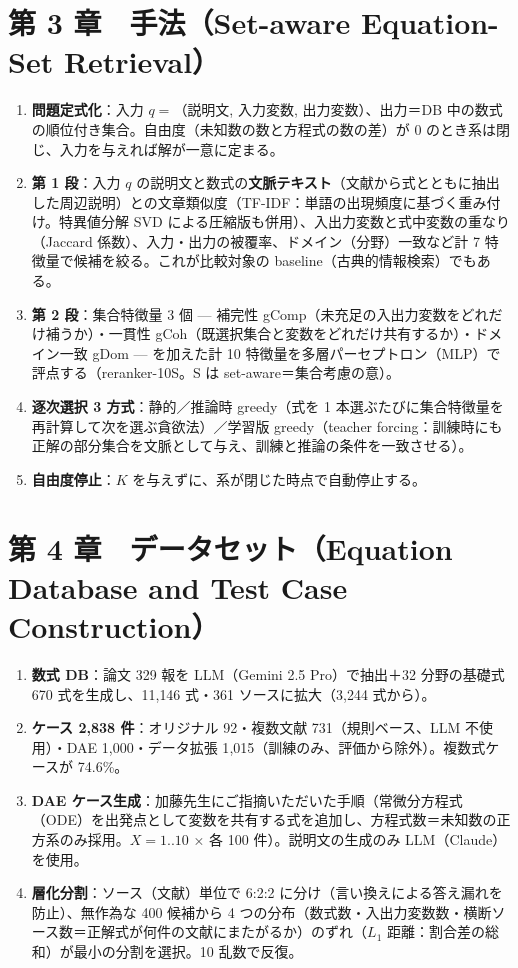 \documentclass[11pt,a4paper]{ltjsarticle}
\begin{document}
\section*{第 3 章　手法（Set-aware Equation-Set Retrieval）}
\begin{enumerate}
  \item \textbf{問題定式化}：入力 $q=$（説明文, 入力変数, 出力変数）、出力＝DB 中の数式の順位付き集合。自由度（未知数の数と方程式の数の差）が 0 のとき系は閉じ、入力を与えれば解が一意に定まる。
  \item \textbf{第 1 段}：入力 $q$ の説明文と数式の\textbf{文脈テキスト}（文献から式とともに抽出した周辺説明）との文章類似度（TF-IDF：単語の出現頻度に基づく重み付け。特異値分解 SVD による圧縮版も併用）、入出力変数と式中変数の重なり（Jaccard 係数）、入力・出力の被覆率、ドメイン（分野）一致など計 7 特徴量で候補を絞る。これが比較対象の baseline（古典的情報検索）でもある。
  \item \textbf{第 2 段}：集合特徴量 3 個 --- 補完性 gComp（未充足の入出力変数をどれだけ補うか）・一貫性 gCoh（既選択集合と変数をどれだけ共有するか）・ドメイン一致 gDom --- を加えた計 10 特徴量を多層パーセプトロン（MLP）で評点する（reranker-10S。S は set-aware＝集合考慮の意）。
  \item \textbf{逐次選択 3 方式}：静的／推論時 greedy（式を 1 本選ぶたびに集合特徴量を再計算して次を選ぶ貪欲法）／学習版 greedy（teacher forcing：訓練時にも正解の部分集合を文脈として与え、訓練と推論の条件を一致させる）。
  \item \textbf{自由度停止}：$K$ を与えずに、系が閉じた時点で自動停止する。
\end{enumerate}

\section*{第 4 章　データセット（Equation Database and Test Case Construction）}
\begin{enumerate}
  \item \textbf{数式 DB}：論文 329 報を LLM（Gemini 2.5 Pro）で抽出＋32 分野の基礎式 670 式を生成し、11{,}146 式・361 ソースに拡大（3{,}244 式から）。
  \item \textbf{ケース 2{,}838 件}：オリジナル 92・複数文献 731（規則ベース、LLM 不使用）・DAE 1{,}000・データ拡張 1{,}015（訓練のみ、評価から除外）。複数式ケースが 74.6\%。
  \item \textbf{DAE ケース生成}：加藤先生にご指摘いただいた手順（常微分方程式（ODE）を出発点として変数を共有する式を追加し、方程式数＝未知数の正方系のみ採用。$X=1..10$ × 各 100 件）。説明文の生成のみ LLM（Claude）を使用。
  \item \textbf{層化分割}：ソース（文献）単位で 6:2:2 に分け（言い換えによる答え漏れを防止）、無作為な 400 候補から 4 つの分布（数式数・入出力変数数・横断ソース数＝正解式が何件の文献にまたがるか）のずれ（$L_1$ 距離：割合差の総和）が最小の分割を選択。10 乱数で反復。
\end{enumerate}
\end{document}
